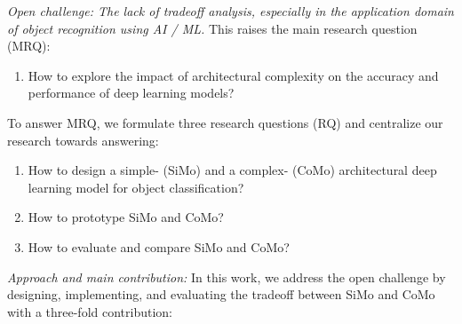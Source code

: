 \textit{Open challenge: The lack of tradeoff analysis, especially in the application domain of object recognition using AI / ML.} This raises the main research question (MRQ):

\begin{enumerate}[label=\textbf{MRQ}]
\item \label{introduction:mrq} How to explore the impact of architectural complexity on the accuracy and performance of deep learning models?
\end{enumerate}

To answer MRQ, we formulate three research questions (RQ) and centralize our research towards answering:

\begin{enumerate}[label=\textbf{RQ\arabic*}]
\item \label{introduction:rq1} How to design a simple- (SiMo) and a complex- (CoMo) architectural deep learning model for object classification?
\item \label{introduction:rq2} How to prototype SiMo and CoMo?
\item \label{introduction:rq3} How to evaluate and compare SiMo and CoMo?
\end{enumerate}

\textit{Approach and main contribution:} In this work, we address the open challenge by designing, implementing, and evaluating the tradeoff between SiMo and CoMo with a three-fold contribution:

